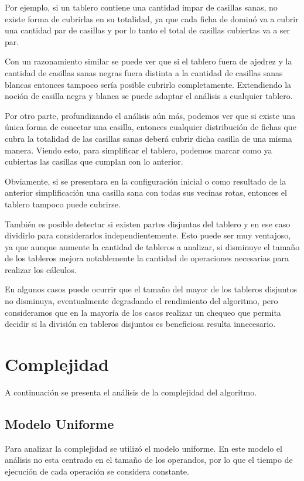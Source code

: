 \documentclass[a4paper, 12pt] {article}
\begin{document}
Por ejemplo, si un tablero contiene una cantidad impar de casillas sanas, no existe forma de cubrirlas en su totalidad, ya que cada ficha de domin\'o va a cubrir una cantidad par de casillas y por lo tanto el total de casillas cubiertas va a ser par.


Con un razonamiento similar se puede ver que si el tablero fuera de ajedrez y la cantidad de casillas sanas negras fuera distinta a la cantidad de casillas sanas blancas entonces tampoco ser\'ia posible cubrirlo completamente. Extendiendo la noci\'on de casilla negra y blanca se puede adaptar el an\'alisis a cualquier tablero.


Por otro parte, profundizando el an\'alisis a\'un m\'as, podemos ver que si existe una \'unica forma de conectar una casilla, entonces cualquier distribuci\'on de fichas que cubra la totalidad de las casillas sanas deber\'a cubrir dicha casilla de una misma manera. Viendo esto, para simplificar el tablero, podemos marcar como ya cubiertas las casillas que cumplan con lo anterior.


Obviamente, si se presentara en la configuraci\'on inicial o como resultado de la anterior simplificaci\'on una casilla sana con todas sus vecinas rotas, entonces el tablero tampoco puede cubrirse.


Tambi\'en es posible detectar si existen partes disjuntas del tablero y en ese caso dividirlo para considerarlos independientemente. Esto puede ser muy ventajoso, ya que aunque aumente la cantidad de tableros a analizar, si disminuye el tama\~no de los tableros mejora notablemente la cantidad de operaciones necesarias para realizar los c\'alculos. 


En algunos casos puede ocurrir que el tama\~no del mayor de los tableros disjuntos no disminuya, eventualmente degradando el rendimiento del algoritmo, pero consideramos que en la mayor\'ia de los casos realizar un chequeo que permita decidir si la divisi\'on en tableros disjuntos es beneficiosa resulta innecesario.
\section*{Complejidad}
A continuaci\'on se presenta el an\'alisis de la complejidad del algoritmo.


\subsection*{Modelo Uniforme}
Para analizar la complejidad se utiliz\'o el modelo uniforme. En este modelo el an\'alisis no esta centrado en el tama\~{n}o de los operandos, por lo que el tiempo de ejecuci\'on de cada operaci\'on se considera constante.
\end{document}
